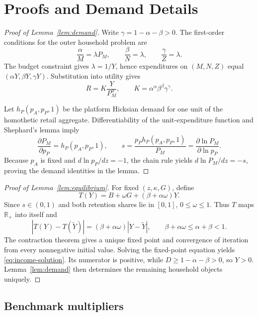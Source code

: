 \appendix
\setcounter{equation}{0}
\renewcommand{\theequation}{A.\arabic{equation}}
\renewcommand{\theHequation}{A.\arabic{equation}}

\section{Proofs and Demand Details}
\label{app:proofs}

\begin{proof}[Proof of Lemma~\ref{lem:demand}]
Write \(\gamma=1-\alpha-\beta>0\). The first-order conditions for the
outer household problem are
\[
 \frac{\alpha}{M}=\lambda P_M,\qquad
 \frac{\beta}{N}=\lambda,\qquad
 \frac{\gamma}{Z}=\lambda.
\]
The budget constraint gives \(\lambda=1/Y\), hence expenditures on
\((M,N,Z)\) equal \((\alpha Y,\beta Y,\gamma Y)\). Substitution into utility
gives
\begin{equation}
 R=K\frac{Y}{P_M^\alpha},\qquad
 K=\alpha^\alpha\beta^\beta\gamma^\gamma.
 \label{eq:indirect-utility-proof}
\end{equation}

Let \(h_P(p_A,p_P,1)\) be the platform Hicksian demand for one unit of the
homothetic retail aggregate. Differentiability of the unit-expenditure
function and Shephard's lemma imply
\[
 \frac{\partial P_M}{\partial p_P}=h_P(p_A,p_P,1),\qquad
 s=\frac{p_Ph_P(p_A,p_P,1)}{P_M}
   =\frac{\partial\ln P_M}{\partial\ln p_P}.
\]
Because \(p_A\) is fixed and \(d\ln p_P/dz=-1\), the chain rule yields
\(d\ln P_M/dz=-s\), proving the demand identities in the lemma.
\end{proof}

\begin{proof}[Proof of Lemma~\ref{lem:equilibrium}]
For fixed \((z,\kappa,G)\), define
\[
 T(Y)=B+\omega G+(\beta+\alpha\omega)Y.
\]
Since \(s\in(0,1)\) and both retention shares lie in \([0,1]\),
\(0\leq\omega\leq1\). Thus \(T\) maps \(\mathbb R_+\) into itself and
\[
 |T(Y)-T(\widetilde Y)|
 = (\beta+\alpha\omega)|Y-\widetilde Y|,
 \qquad \beta+\alpha\omega\leq\alpha+\beta<1.
\]
The contraction theorem gives a unique fixed point and convergence of
iteration from every nonnegative initial value. Solving the fixed-point
equation yields \eqref{eq:income-solution}. Its numerator is positive, while
\(D\geq1-\alpha-\beta>0\), so \(Y>0\). Lemma~\ref{lem:demand} then determines
the remaining household objects uniquely.
\end{proof}

\subsection{Benchmark multipliers}

